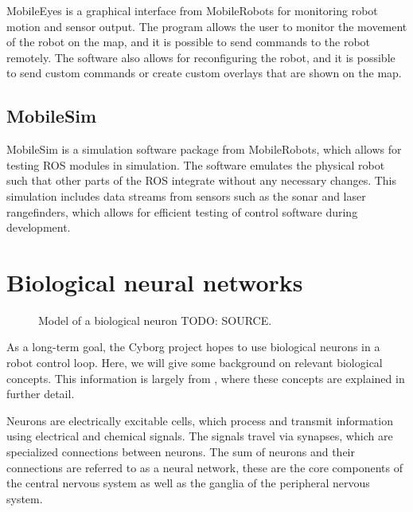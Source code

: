 \documentclass[\rootfolder/main.tex]{subfiles}
\begin{document}
MobileEyes is a graphical interface from MobileRobots for monitoring robot motion and sensor output.
The program allows the user to monitor the movement of the robot on the map, and it is possible to send commands to the robot remotely.
The software also allows for reconfiguring the robot, and it is possible to send custom commands or create custom overlays that are shown on the map.

\subsection{MobileSim}

MobileSim is a simulation software package from MobileRobots, which allows for testing ROS modules in simulation.
The software emulates the physical robot such that other parts of the ROS integrate without any necessary changes.
This simulation includes data streams from sensors such as the sonar and laser rangefinders, which allows for efficient testing of control software during development.


\section{Biological neural networks}

\begin{figure}
    \caption{Model of a biological neuron TODO: SOURCE.\label{fig:biological_neuron}}
\end{figure}

As a long-term goal, the Cyborg project hopes to use biological neurons in a robot control loop.
Here, we will give some background on relevant biological concepts.
This information is largely from \cite{Knudsen2016}, where these concepts are explained in further detail.

Neurons are electrically excitable cells, which process and transmit information using electrical and chemical signals.
The signals travel via synapses, which are specialized connections between neurons.
The sum of neurons and their connections are referred to as a neural network, these are the core components of the central nervous system as well as the ganglia of the peripheral nervous system.
\end{document}

